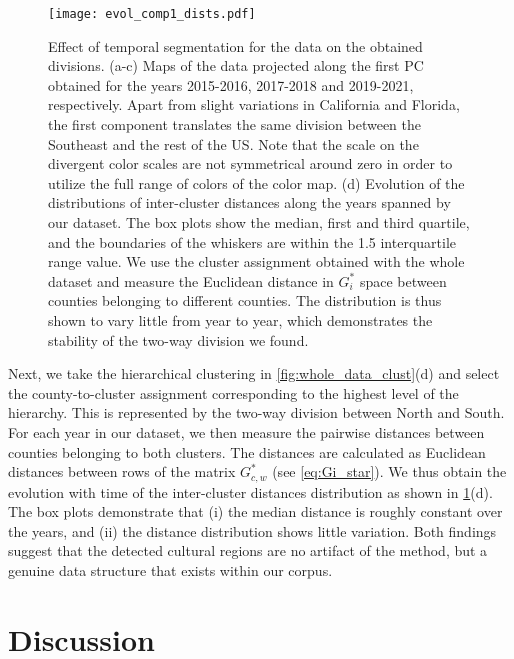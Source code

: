 \documentclass[../thesis.tex]{subfiles}
\begin{document}
\begin{figure}[ht!]
\centering
  \texttt{[image: evol\_comp1\_dists.pdf]}
  \caption{Effect of temporal segmentation for the data on the obtained divisions. (a-c)
  Maps of the data projected along the first \ac{PC} obtained for the years 2015-2016,
  2017-2018 and 2019-2021, respectively. Apart from slight variations in California and
  Florida, the first component translates the same division between the Southeast and
  the rest of the US. Note that the scale on the divergent color scales are not
  symmetrical around zero in order to utilize the full range of colors of the color map.
  (d) Evolution of the distributions of inter-cluster distances along the years spanned
  by our dataset. The box plots show the median, first and third quartile, and the
  boundaries of the whiskers are within the 1.5 interquartile range value. We use the
  cluster assignment obtained with the whole dataset and measure the Euclidean distance
  in $G_i^*$ space between counties belonging to different counties. The distribution is
  thus shown to vary little from year to year,  which demonstrates the stability of the
  two-way division we found.}
  \label{fig:evol_comp1_dists}
\end{figure}

Next, we take the hierarchical clustering in \cref{fig:whole_data_clust}(d) and select
the county-to-cluster assignment corresponding to the highest level of the hierarchy.
This is represented by the two-way division between North and South. For each year in
our dataset, we then measure the pairwise distances between counties belonging to both
clusters. The distances are calculated as Euclidean distances between rows of the matrix
$G_{c, w}^*$ (see \cref{eq:Gi_star}). We thus obtain the evolution with time of the
inter-cluster distances distribution as shown in \cref{fig:evol_comp1_dists}(d). The box
plots demonstrate that (i) the median distance is roughly constant over the years, and
(ii) the distance distribution shows little variation. Both findings suggest that the
detected cultural regions are no artifact of the method, but a genuine data structure
that exists within our corpus.

\section{Discussion}
\end{document}
